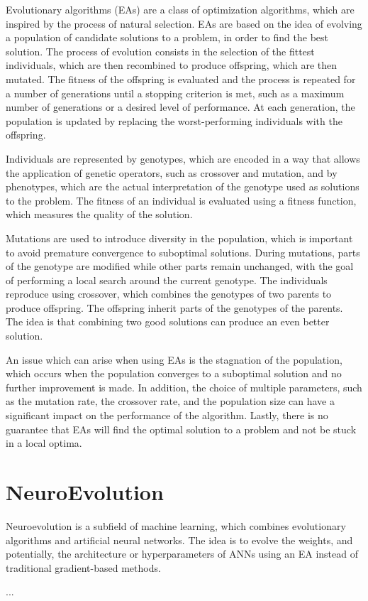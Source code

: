 Evolutionary algorithms (EAs) are a class of optimization algorithms, which are inspired by the process of natural selection. EAs are based on the idea of
evolving a population of candidate solutions to a problem, in order to find the best solution. The process of evolution consists in the selection of the
fittest individuals, which are then recombined to produce offspring, which are then mutated. The fitness of the offspring is evaluated and the process is
repeated for a number of generations until a stopping criterion is met, such as a maximum number of generations or a desired level of performance.
At each generation, the population is updated by replacing the worst-performing individuals with the offspring.

Individuals are represented by genotypes, which are encoded in a way that allows the application of genetic operators, such as crossover and mutation, and
by phenotypes, which are the actual interpretation of the genotype used as solutions to the problem. The fitness of an individual is evaluated using a
fitness function, which measures the quality of the solution.

Mutations are used to introduce diversity in the population, which is important to avoid premature convergence to suboptimal solutions. During mutations,
parts of the genotype are modified while other parts remain unchanged, with the goal of performing a local search around the current genotype.
The individuals reproduce using crossover, which combines the genotypes of two parents to produce offspring. The offspring inherit parts of the genotypes
of the parents. The idea is that combining two good solutions can produce an even better solution.


An issue which can arise when using EAs is the stagnation of the population, which occurs when the population converges to a suboptimal solution and
no further improvement is made. In addition, the choice of multiple parameters, such as the mutation rate, the crossover rate, and the population size
can have a significant impact on the performance of the algorithm. Lastly, there is no guarantee that EAs will find the optimal solution to a problem and
not be stuck in a local optima.

\section{NeuroEvolution}

Neuroevolution is a subfield of machine learning, which combines evolutionary algorithms and artificial neural networks. The idea is to evolve the weights,
and potentially, the architecture or hyperparameters of ANNs using an EA instead of traditional gradient-based methods.

...
